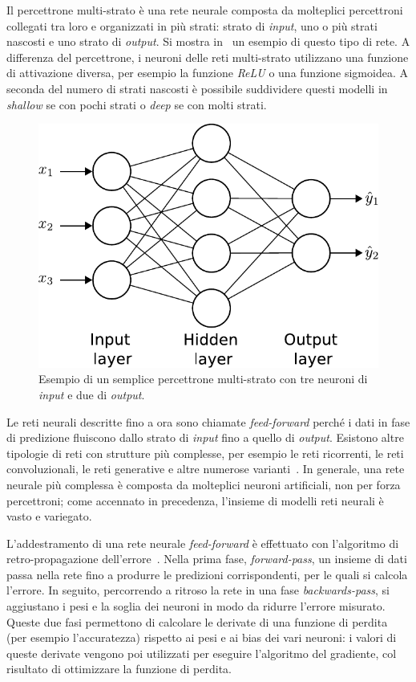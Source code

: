 Il percettrone multi-strato è una rete neurale composta da molteplici percettroni collegati tra loro e organizzati in più strati: strato di \emph{input}, uno o più strati nascosti e uno strato di \emph{output}. Si mostra in~ un esempio di questo tipo di rete. 
A differenza del percettrone, i neuroni delle reti multi-strato utilizzano una funzione di attivazione 
diversa, per esempio la funzione \emph{ReLU} o una funzione sigmoidea.
A seconda del numero di strati nascosti è possibile suddividere questi modelli in \emph{shallow} se con pochi strati o \emph{deep} se con molti strati.
\begin{figure}
    \centering
    \includegraphics[width=0.5\linewidth]{img/nn.pdf}
    \caption[Esempio percettrone multi-strato.]{Esempio di un semplice percettrone multi-strato con tre neuroni di \emph{input} e due di \emph{output}.}
    \label{fig:NN}
\end{figure}
Le reti neurali descritte fino a ora sono chiamate \emph{feed-forward} perché i dati in fase di predizione fluiscono dallo strato di \emph{input} fino a quello di \emph{output}.
Esistono altre tipologie di reti con strutture più complesse, per esempio le reti ricorrenti, le reti convoluzionali, le reti generative e altre numerose varianti~\cite{aggarwal2018neural}.
In generale, una rete neurale più complessa è composta da molteplici neuroni artificiali, non per forza percettroni; come accennato in precedenza, l'insieme di modelli reti neurali è vasto e variegato.

L'addestramento di una rete neurale \emph{feed-forward} è effettuato con l'algoritmo di retro-propagazione dell'errore~\cite{neural_networks}.
Nella prima fase, \emph{forward-pass}, un insieme di dati passa nella rete fino a produrre le predizioni corrispondenti, per le quali si calcola l'errore. In seguito, percorrendo a ritroso la rete in una fase \emph{backwards-pass}, si aggiustano i pesi e la soglia dei neuroni in modo da ridurre l'errore misurato.
Queste due fasi permettono di calcolare le derivate di una funzione di perdita (per esempio l'accuratezza) rispetto ai pesi e ai bias dei vari neuroni: i valori di queste derivate vengono poi utilizzati per eseguire l'algoritmo del gradiente, col risultato di ottimizzare la funzione di perdita.


